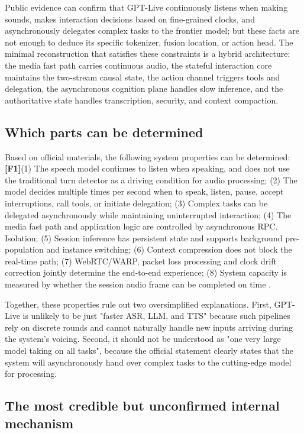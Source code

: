 \documentclass[UTF8,fontset=none,a4paper,10pt]{ctexart}
\newcommand{\FOne}{\textcolor{official}{\textbf{[F1]}}}
\begin{document}
Public evidence can confirm that GPT-Live continuously listens when making sounds, makes interaction decisions based on fine-grained clocks, and asynchronously delegates complex tasks to the frontier model; but these facts are not enough to deduce its specific tokenizer, fusion location, or action head. The minimal reconstruction that satisfies these constraints is a hybrid architecture: the media fast path carries continuous audio, the stateful interaction core maintains the two-stream causal state, the action channel triggers tools and delegation, the asynchronous cognition plane handles slow inference, and the authoritative state handles transcription, security, and context compaction.

\subsection{Which parts can be determined}

Based on official materials, the following system properties can be determined: \FOne (1) The speech model continues to listen when speaking, and does not use the traditional turn detector as a driving condition for audio processing; (2) The model decides multiple times per second when to speak, listen, pause, accept interruptions, call tools, or initiate delegation; (3) Complex tasks can be delegated asynchronously while maintaining uninterrupted interaction; (4) The media fast path and application logic are controlled by asynchronous RPC. Isolation; (5) Session inference has persistent state and supports background pre-population and instance switching; (6) Context compression does not block the real-time path; (7) WebRTC/WARP, packet loss processing and clock drift correction jointly determine the end-to-end experience; (8) System capacity is measured by whether the session audio frame can be completed on time \cite{en:openai2026gptlive,en:openai2026continuous}.

Together, these properties rule out two oversimplified explanations. First, GPT-Live is unlikely to be just "faster ASR, LLM, and TTS" because such pipelines rely on discrete rounds and cannot naturally handle new inputs arriving during the system's voicing. Second, it should not be understood as "one very large model taking on all tasks", because the official statement clearly states that the system will asynchronously hand over complex tasks to the cutting-edge model for processing.

\subsection{The most credible but unconfirmed internal mechanism}
\end{document}
